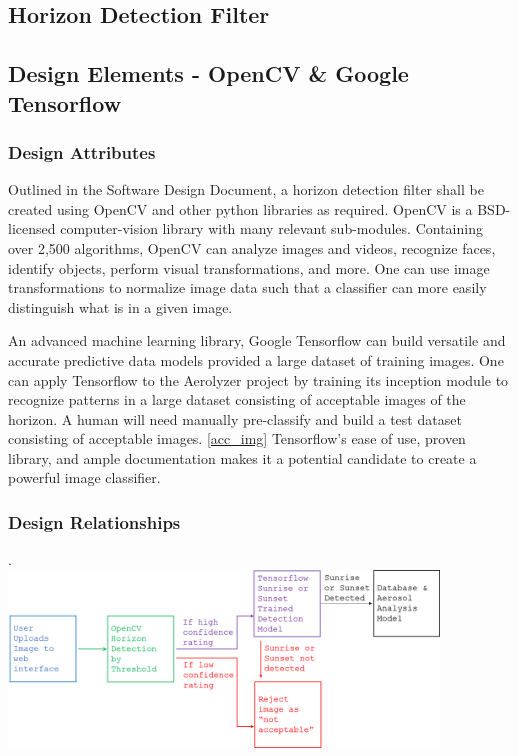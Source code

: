 \documentclass[onecolumn, draftclsnofoot,10pt, compsoc]{IEEEtran}
\begin{document}
\begin{singlespace}
		

	\section{Horizon Detection Filter}
      \subsection{Design Elements - OpenCV \& Google Tensorflow}
      		\subsubsection{Design Attributes}
		        Outlined in the Software Design Document, a horizon detection filter shall be created using OpenCV and other python libraries as required.
				OpenCV is a BSD-licensed computer-vision library with many relevant sub-modules.
				Containing over 2,500 algorithms, OpenCV can analyze images and videos, recognize faces, identify objects, perform visual transformations, and more.
				One can use image transformations to normalize image data such that a classifier can more easily distinguish what is in a given image.
				\cite{svm}

				An advanced machine learning library, Google Tensorflow can build versatile and accurate predictive data models provided a large dataset of training images.
				One can apply Tensorflow to the Aerolyzer project by training its inception module to recognize patterns in a large dataset consisting of acceptable images of the horizon.
				A human will need manually pre-classify and build a test dataset consisting of acceptable images. \ref{acc_img}
				Tensorflow’s ease of use, proven library, and ample documentation makes it a potential candidate to create a powerful image classifier. \cite{rhnvrm} \cite{RNN}

          \subsubsection{Design Relationships}
					.\\
					\includegraphics[width=4.5in,natwidth=1907,natheight=787]{images/tensor.png}


\end{singlespace}
\end{document}
